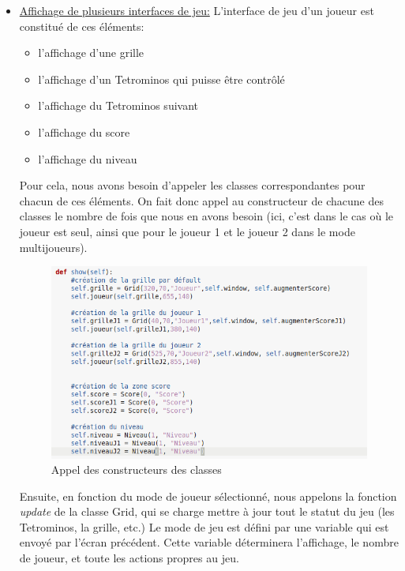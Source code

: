 \documentclass[a4paper, 11pt]{article}
\begin{document}
\begin{itemize}
\begin{itemize}
            		\item \underline {Affichage de plusieurs interfaces de jeu:}	%
            		L'interface de jeu d'un joueur est constitué de ces éléments:
            		\begin{itemize}
            		    \item l'affichage d'une grille
            		    \item l'affichage d'un Tetrominos qui puisse être contrôlé
            		    \item l'affichage du Tetrominos suivant
            		    \item l'affichage du score
            		    \item l'affichage du niveau
            		\end{itemize}
            		
                Pour cela, nous avons besoin d'appeler les classes correspondantes pour chacun de ces éléments. On fait donc appel au constructeur de chacune des classes le nombre de fois que nous en avons besoin (ici, c'est dans le cas où le joueur est seul, ainsi que pour le joueur 1 et le joueur 2 dans le mode multijoueurs). 
                
                \begin{figure}[ht]
                    \centering
                    \includegraphics[scale=0.5]{images/appelConstr.png}
                    \caption{Appel des constructeurs des classes}
                \end{figure}
                
                \newpage
                Ensuite, en fonction du mode de joueur sélectionné, nous appelons la fonction \textit{update} de la classe Grid, qui se charge mettre à jour tout le statut du jeu (les Tetrominos, la grille, etc.)
                \newline
                Le mode de jeu est défini par une variable qui est envoyé par l'écran précédent. Cette variable déterminera l'affichage, le nombre de joueur, et toute les actions propres au jeu.
                

\end{itemize}
\end{itemize}
\end{document}
